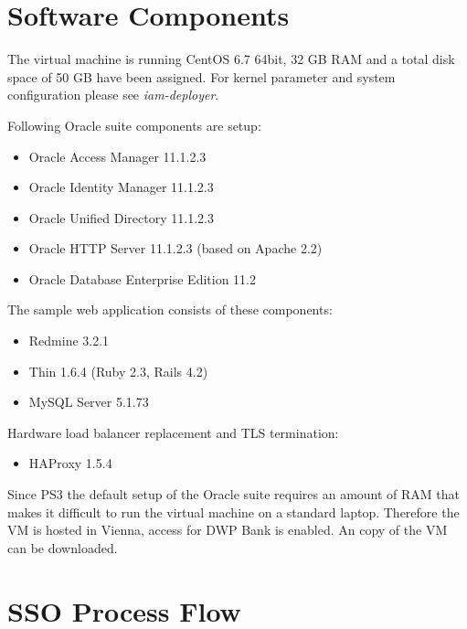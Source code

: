 \documentclass[11pt]{report}
\begin{document}
\section{Software Components}

The virtual machine is running CentOS 6.7 64bit, 32 GB RAM and a total
disk space of 50 GB have been assigned.  For kernel parameter and system
configuration please see \emph{iam-deployer}.

Following Oracle suite components are setup:

\begin{itemize}

    \item Oracle Access Manager 11.1.2.3
    \item Oracle Identity Manager 11.1.2.3
    \item Oracle Unified Directory 11.1.2.3
    \item Oracle HTTP Server 11.1.2.3 (based on Apache 2.2) 
    \item Oracle Database Enterprise Edition 11.2

\end{itemize}

The sample web application consists of these components:

\begin{itemize}

    \item Redmine 3.2.1
    \item Thin 1.6.4 (Ruby 2.3, Rails 4.2)
    \item MySQL Server 5.1.73

\end{itemize}

Hardware load balancer replacement and TLS termination:

\begin{itemize}

    \item HAProxy 1.5.4

\end{itemize}


Since PS3 the default setup of the Oracle suite requires an amount of RAM that
makes it difficult to run the virtual machine on a standard laptop.  Therefore
the VM is hosted in Vienna, access for DWP Bank is enabled.  An copy of the VM
can be downloaded.



\section{SSO Process Flow}
\end{document}
